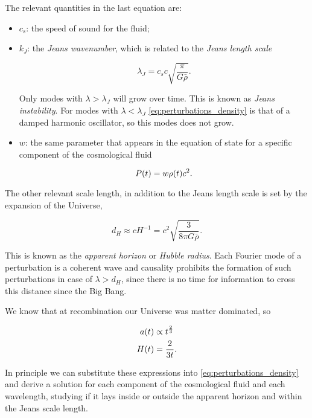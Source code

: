 The relevant quantities in the last equation are:

\begin{itemize}
        \item $c_s$: the speed of sound for the fluid;
        \item $k_J$: the \emph{Jeans wavenumber}, which is related to the
        \emph{Jeans length scale}

        \begin{equation}
                \lambda_J = c_s c \sqrt{\frac{\pi}{G \bar \rho}}.
        \end{equation}

        Only modes with $\lambda > \lambda_J$ will grow over time. This is
        known as \emph{Jeans instability}.
        For modes with $\lambda < \lambda_J$
        \autoref{eq:perturbations_density} is that of a damped harmonic
        oscillator, so this modes does not grow.

        \item $w$: the same parameter that appears in the equation of state
        for a specific component of the cosmological fluid

        \begin{equation}
                P\qty(t) = w \rho\qty(t) c^2.
        \end{equation}
\end{itemize}

The other relevant scale length, in addition to the Jeans length scale is
set by the expansion of the Universe,

\begin{equation}
        d_H \approx cH^{-1} = c^2 \sqrt{\frac{3}{8\pi G \bar \rho}}.
\end{equation}

This is known as the \emph{apparent horizon} or \emph{Hubble radius}.
Each Fourier mode of a perturbation
is a coherent wave and causality prohibits the formation of such perturbations
in case of $\lambda > d_H$, since there is no time for information to cross
this distance since the Big Bang.

We know that at recombination our Universe was matter dominated, so

\begin{align}
        a\qty(t) & \propto t^\frac{2}{3} \\
        H\qty(t) & = \frac{2}{3t}.
\end{align}

In principle we can substitute these expressions into
\autoref{eq:perturbations_density} and derive a solution for each component
of the cosmological fluid and each wavelength, studying if it lays inside
or outside the apparent horizon and within the Jeans scale length.

